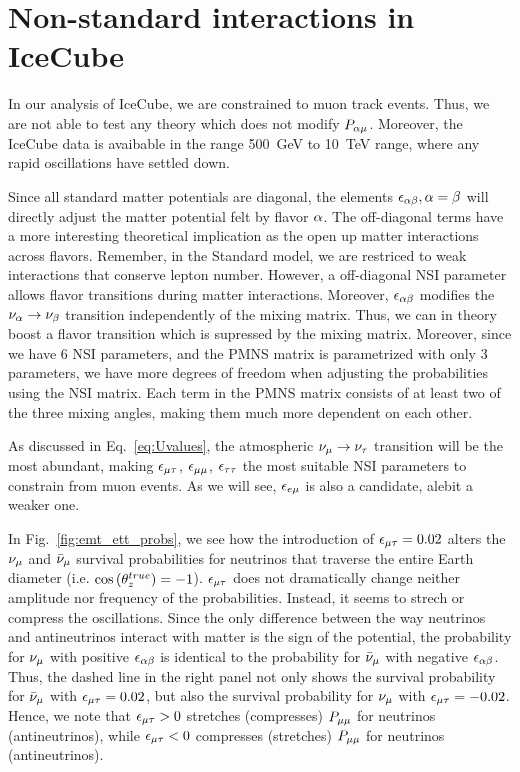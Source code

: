 \documentclass{thesis}
\begin{document}
\section{Non-standard interactions in IceCube}
In our analysis of IceCube, we are constrained to muon track events. Thus, we are not able to test any theory which does not modify $P_{\alpha \mu}$. Moreover,
the IceCube data is avaibable in the range \SI{500}{\GeV} to \SI{10}{\TeV} range, where any rapid oscillations have settled down.

Since all standard matter potentials are diagonal, 
the elements $\epsilon_{\alpha\beta}, \alpha = \beta$ will directly adjust the matter potential felt 
by flavor $\alpha$. The off-diagonal terms have a more interesting theoretical implication as the open up matter interactions across flavors. Remember, in the Standard model,
we are restriced to weak interactions that conserve lepton number. However, a off-diagonal NSI parameter allows flavor transitions during matter interactions.
Moreover, $\epsilon_{\alpha\beta}$ modifies the $\nu_\alpha \to \nu_\beta$ transition independently
of the mixing matrix. Thus, we can in theory boost a flavor transition which is supressed by the mixing matrix. Moreover, since we have 6 NSI parameters, and the PMNS
matrix is parametrized with only 3 parameters, we have more degrees of freedom when adjusting the probabilities using the NSI matrix. Each term in the PMNS matrix consists of at least
two of the three mixing angles, making them much more dependent on each other.

As discussed in Eq.~\ref{eq:Uvalues}, the atmospheric $\nu_\mu \to \nu_\tau$ transition will be the most abundant, making $\epsilon_{\mu\tau}$, $\epsilon_{\mu\mu}$, $\epsilon_{\tau\tau}$ the most suitable
NSI parameters to constrain from muon events. As we will see, $\epsilon_{e\mu}$ is also a candidate, alebit a weaker one. 

In Fig.~\ref{fig:emt_ett_probs}, we see how the introduction of $\epsilon_{\mu\tau} = 0.02$ alters the $\nu_\mu$ and $\bar\nu_\mu$ survival probabilities
for neutrinos that traverse the entire Earth diameter (i.e. $\cos{(\theta_z^{true})} = -1$). $\epsilon_{\mu\tau}$ does not dramatically change neither
amplitude nor frequency of the probabilities. Instead, it seems to strech or compress the oscillations. Since the 
only difference between the way neutrinos and antineutrinos interact with matter is the sign of the potential, the probability for
$\nu_\mu$ with positive $\epsilon_{\alpha\beta}$ is identical to the probability for $\bar\nu_\mu$ with negative $\epsilon_{\alpha\beta}$. Thus, the dashed line 
in the right panel not only shows the survival probability for $\bar\nu_\mu$ with $\epsilon_{\mu\tau}=0.02$, but also the survival probability for $\nu_\mu$ with $\epsilon_{\mu\tau}=-0.02$.
Hence, we note that $\epsilon_{\mu\tau} > 0$ stretches (compresses) $P_{\mu\mu}$ for neutrinos (antineutrinos), while $\epsilon_{\mu\tau} < 0$ compresses (stretches) $P_{\mu\mu}$ for neutrinos (antineutrinos).
\end{document}
